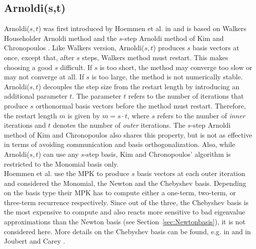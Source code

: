 \documentclass{scrartcl}
\numberwithin{equation}{section}
\begin{document}
\subsection{Arnoldi(s,t)}
Arnoldi($s,t$) was first introduced by Hoemmen et al. in \cite{Hoemmen:2010:CKS:1970638} and is based on Walkers Householder Arnoldi method \cite{doi:10.1137/Walker} and the $s$-step Arnoldi method of Kim and Chronopoulos \cite{Chronopoulos}. Like Walkers version, Arnoldi($s,t$) produces $s$ basis vectors at once, except that, after $s$ steps, Walkers method must restart. This makes choosing a good $s$ difficult. If $s$ is too short, the method may converge too slow or may not converge at all. If $s$ is too large, the method is not numerically stable.\\ Arnoldi($s,t$) decouples the step size from the restart length by introducing an additional parameter $t$. The parameter $t$ refers to the number of iterations that produce $s$ orthonormal basis vectors before the method must restart. Therefore, the restart length $m$ is given by $m = s \cdot t$, where $s$ refers to the number of \textit{inner} iterations and $t$ denotes the number of \textit{outer} iterations.
The $s$-step Arnoldi method of Kim and Chronopoulos also shares this property, but is not as effective in terms of avoiding communication and basis orthogonalization. Also, while Arnoldi($s,t$) can use any $s$-step basis, Kim and Chronopoulos' algorithm is restricted to the Monomial basis only.\\
Hoemmen et al. \cite{Hoemmen:2010:CKS:1970638} use the MPK to produce  $s$ basis vectors at each outer iteration and considered the Monomial, the Newton and the Chebyshev basis. Depending on the basis type their MPK has to compute either a one-term, two-term, or three-term recurrence respectively. Since out of the three, the Chebyshev basis is the most expensive to compute and also reacts more sensitive to bad eigenvalue approximations than the Newton basis (see Section~\ref{sec:Newtonbasis}), it is not considered here. More details on the Chebyshev basis can be found, e.g. in \cite{Hoemmen:2010:CKS:1970638} and in Joubert and Carey \cite{Joubert_Carey_Chebyshev}.
\end{document}
